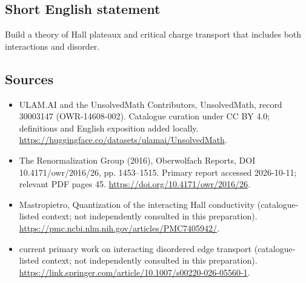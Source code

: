 \documentclass[11pt]{article}
\begin{document}
\subsection{Short English statement}
Build a theory of Hall plateaux and critical charge transport that includes both interactions and disorder.
\subsection{Sources}
\begin{itemize}
\item[\hypertarget{source:30003147:1}{S1}] ULAM.AI and the UnsolvedMath Contributors, UnsolvedMath, record 30003147 (OWR-14608-002). Catalogue curation under CC BY 4.0; definitions and English exposition added locally.
\url{https://huggingface.co/datasets/ulamai/UnsolvedMath}.
\item[\hypertarget{source:30003147:2}{S2}] The Renormalization Group (2016), Oberwolfach Reports, DOI 10.4171/owr/2016/26, pp. 1453--1515. Primary report accessed 2026-10-11; relevant PDF pages 45.
\url{https://doi.org/10.4171/owr/2016/26}.
\item[\hypertarget{source:30003147:3}{S3}] Mastropietro, Quantization of the interacting Hall conductivity (catalogue-listed context; not independently consulted in this preparation).
\url{https://pmc.ncbi.nlm.nih.gov/articles/PMC7405942/}.
\item[\hypertarget{source:30003147:4}{S4}] current primary work on interacting disordered edge transport (catalogue-listed context; not independently consulted in this preparation).
\url{https://link.springer.com/article/10.1007/s00220-026-05560-1}.
\end{itemize}
\label{end:30003147}
\end{document}
